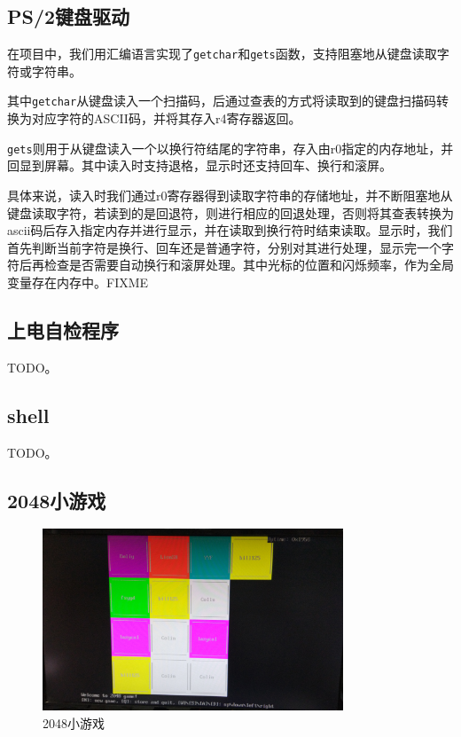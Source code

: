 \documentclass[11pt,utf8]{report}
\begin{document}
\subsection{PS/2键盘驱动}
	在项目中，我们用汇编语言实现了\texttt{getchar}和\texttt{gets}函数，支持阻塞地从键盘读取字符或字符串。

	其中\texttt{getchar}从键盘读入一个扫描码，后通过查表的方式将读取到的键盘扫描码转换为对应字符的ASCII码，并将其存入r4寄存器返回。

	\texttt{gets}则用于从键盘读入一个以换行符结尾的字符串，存入由r0指定的内存地址，并回显到屏幕。其中读入时支持退格，显示时还支持回车、换行和滚屏。

	具体来说，读入时我们通过r0寄存器得到读取字符串的存储地址，并不断阻塞地从键盘读取字符，若读到的是回退符，则进行相应的回退处理，否则将其查表转换为ascii码后存入指定内存并进行显示，并在读取到换行符时结束读取。显示时，我们首先判断当前字符是换行、回车还是普通字符，分别对其进行处理，显示完一个字符后再检查是否需要自动换行和滚屏处理。其中光标的位置和闪烁频率，作为全局变量存在内存中。FIXME

\subsection{上电自检程序}
	\par TODO。

\subsection{shell}
	\par TODO。

\subsection{2048小游戏}
	\begin{center}
	\begin{figure}[H]
			\centering
			\includegraphics[width=0.8\textwidth]{2048.jpg}
			\caption{2048小游戏}
		\end{figure}
	\end{center}
\end{document}
